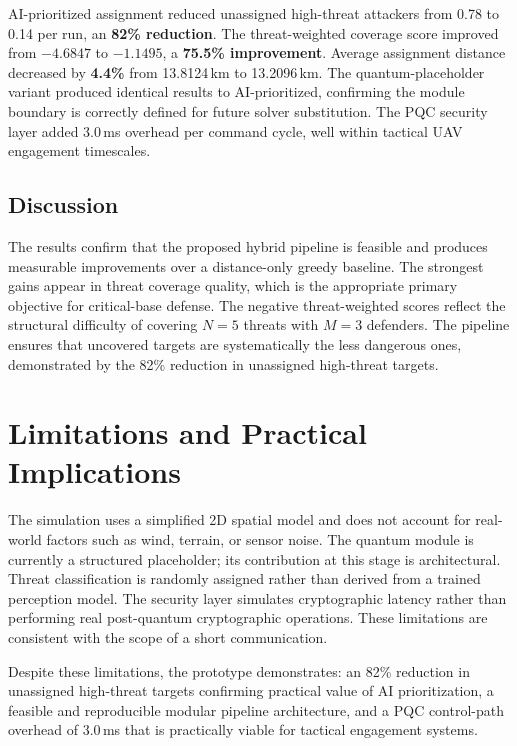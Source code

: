 \documentclass[12pt, a4paper]{article}
\begin{document}
AI-prioritized assignment reduced unassigned high-threat attackers from 0.78 to 0.14 per run, an \textbf{82\% reduction}. The threat-weighted coverage score improved from $-4.6847$ to $-1.1495$, a \textbf{75.5\% improvement}. Average assignment distance decreased by \textbf{4.4\%} from 13.8124\,km to 13.2096\,km. The quantum-placeholder variant produced identical results to AI-prioritized, confirming the module boundary is correctly defined for future solver substitution. The PQC security layer added 3.0\,ms overhead per command cycle, well within tactical UAV engagement timescales.

\subsection{Discussion}

The results confirm that the proposed hybrid pipeline is feasible and produces measurable improvements over a distance-only greedy baseline. The strongest gains appear in threat coverage quality, which is the appropriate primary objective for critical-base defense. The negative threat-weighted scores reflect the structural difficulty of covering $N=5$ threats with $M=3$ defenders. The pipeline ensures that uncovered targets are systematically the less dangerous ones, demonstrated by the 82\% reduction in unassigned high-threat targets.

\section{Limitations and Practical Implications}

The simulation uses a simplified 2D spatial model and does not account for real-world factors such as wind, terrain, or sensor noise. The quantum module is currently a structured placeholder; its contribution at this stage is architectural. Threat classification is randomly assigned rather than derived from a trained perception model. The security layer simulates cryptographic latency rather than performing real post-quantum cryptographic operations. These limitations are consistent with the scope of a short communication.

Despite these limitations, the prototype demonstrates: an 82\% reduction in unassigned high-threat targets confirming practical value of AI prioritization, a feasible and reproducible modular pipeline architecture, and a PQC control-path overhead of 3.0\,ms that is practically viable for tactical engagement systems.
\end{document}
